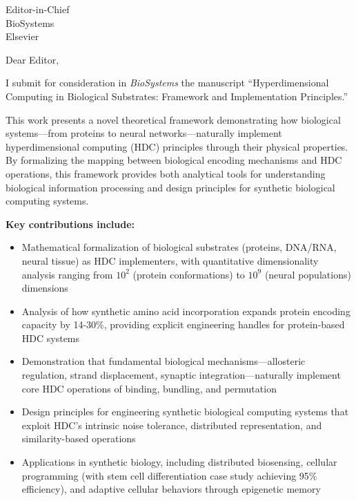 \documentclass[11pt]{letter}
\begin{document}
\begin{letter}{Editor-in-Chief\\BioSystems\\Elsevier}

\opening{Dear Editor,}

I submit for consideration in \textit{BioSystems} the manuscript ``Hyperdimensional Computing in Biological Substrates: Framework and Implementation Principles.''

This work presents a novel theoretical framework demonstrating how biological systems—from proteins to neural networks—naturally implement hyperdimensional computing (HDC) principles through their physical properties. By formalizing the mapping between biological encoding mechanisms and HDC operations, this framework provides both analytical tools for understanding biological information processing and design principles for synthetic biological computing systems.

\textbf{Key contributions include:}

\begin{itemize}
    \item Mathematical formalization of biological substrates (proteins, DNA/RNA, neural tissue) as HDC implementers, with quantitative dimensionality analysis ranging from $10^2$ (protein conformations) to $10^9$ (neural populations) dimensions

    \item Analysis of how synthetic amino acid incorporation expands protein encoding capacity by 14-30\%, providing explicit engineering handles for protein-based HDC systems

    \item Demonstration that fundamental biological mechanisms—allosteric regulation, strand displacement, synaptic integration—naturally implement core HDC operations of binding, bundling, and permutation

    \item Design principles for engineering synthetic biological computing systems that exploit HDC's intrinsic noise tolerance, distributed representation, and similarity-based operations

    \item Applications in synthetic biology, including distributed biosensing, cellular programming (with stem cell differentiation case study achieving 95\% efficiency), and adaptive cellular behaviors through epigenetic memory
\end{itemize}


\end{letter}
\end{document}
